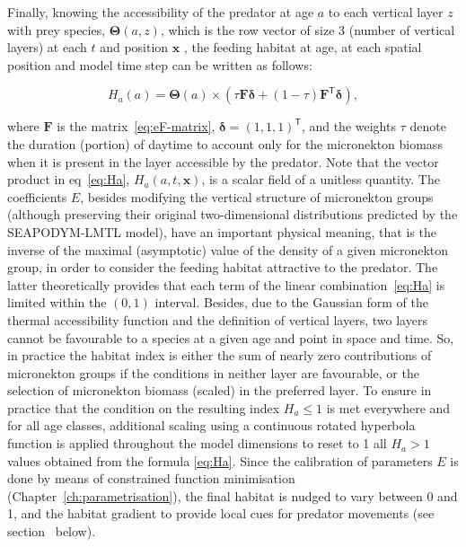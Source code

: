 Finally, knowing the accessibility of the predator at age $a$ to each vertical layer $z$ with prey species, $\boldsymbol{\Theta}(a,z)$, which is the row vector of size 3 (number of vertical layers) at each $t$ and position $\mathbf{x}$ , the feeding habitat at age, at each spatial position and model time step can be written as follows:

\begin{equation}
	H_a(a) = \boldsymbol{\Theta}(a) \times \left(\tau {\mathbf F}{\mathbf \delta} +(1-\tau) {\mathbf F^{\mathsf{T}}} {\mathbf \delta}\right),
\label{eq:Ha}	
\end{equation}

\noindent where ${\mathbf F}$ is the matrix~\eqref{eq:eF-matrix}, $\mathbf{\delta}=(1,1,1)^{\mathsf{T}}$, and the weights $\tau$ denote the duration (portion) of daytime to account only for the micronekton biomass when it is present in the layer accessible by the predator. Note that the vector product in eq~\ref{eq:Ha}, $H_a(a,t,\mathbf{x})$, is a scalar field of a unitless quantity. The coefficients $E$, besides modifying the vertical structure of micronekton groups (although preserving their original two-dimensional distributions predicted by the SEAPODYM-LMTL model), have an important physical meaning, that is the inverse of the maximal (asymptotic) value of the density of a given micronekton group, in order to consider the feeding habitat attractive to the predator. The latter theoretically provides that each term of the linear combination~\eqref{eq:Ha} is limited within the $(0,1)$ interval. Besides, due to the Gaussian form of the thermal accessibility function and the definition of vertical layers, two layers cannot be favourable to a species at a given age and point in space and time. So, in practice the habitat index is either the sum of nearly zero contributions of micronekton groups if the conditions in neither layer are favourable, or the selection of micronekton biomass (scaled) in the preferred layer. To ensure in practice that the condition on the resulting index $H_a\leq1$ is met everywhere and for all age classes, additional scaling using a continuous rotated hyperbola function is applied throughout the model dimensions to reset to 1 all $H_a>1$ values obtained from the formula \eqref{eq:Ha}. Since the calibration of parameters $E$ is done by means of constrained function minimisation (Chapter~\ref{ch:parametrisation}), the final habitat is nudged to vary between 0 and 1, and the habitat gradient to provide local cues for predator movements (see section~{} below). 

